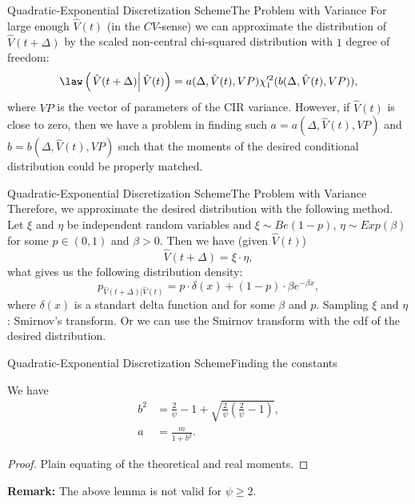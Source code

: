     \begin{frame}{Quadratic-Exponential Discretization Scheme}{The Problem with Variance}
        For large enough $\hat{V}(t)$ (in the $CV$-sense) we can approximate the distribution of $\hat{V}(t+\Delta)$ by the scaled non-central chi-squared distribution with $1$ degree of freedom:
        \begin{align}
            \law\left(\left.\hat{V}(t+\Delta) \right| \hat V(t)\right) =  a(\Delta, \hat{V}(t), VP) \chi'^2_1(b(\Delta, \hat{V}(t), VP)),
        \end{align}
        where $VP$ is the vector of parameters of the CIR variance.
        However, if $\hat{V}(t)$ is close to zero, then we have a problem in finding such $a = a(\Delta, \hat{V}(t), VP)$ and $b = b(\Delta, \hat{V}(t), VP)$ such that the moments of the desired conditional distribution could be properly matched.
    \end{frame}

    \begin{frame}{Quadratic-Exponential Discretization Scheme}{The Problem with Variance}
        Therefore, we approximate the desired distribution with the following method. Let $\xi$ and $\eta$ be independent random variables and  $\xi \sim Be(1-p)$, $\eta \sim Exp(\beta)$ for some $p \in (0, 1)$ and $\beta > 0$. Then we have (given $\hat{V}(t)$)
        \begin{equation}
            \hat{V}(t+\Delta) = \xi\cdot\eta,
        \end{equation}
        what gives us the following distribution density:
        \begin{equation}
            p_{\hat{V}(t+\Delta)\vert \hat{V}(t)} = p\cdot \delta(x) + (1-p) \cdot\beta e^{-\beta x},
        \end{equation}
        where $\delta(x)$ is a standart delta function and for some $\beta$ and $p$.
        Sampling $\xi$ and $\eta$: Smirnov's transform. Or we can use the Smirnov transform with the cdf of the desired distribution.
    \end{frame}

    \begin{frame}{Quadratic-Exponential Discretization Scheme}{Finding the constants}
        \begin{lemma}
            We have
            \begin{align}
                b^2 &= \frac{2}{\psi} -1 +\sqrt{\frac{2}{\psi}\left(\frac{2}{\psi}-1\right)}, \\ 
                a   &= \frac{m}{1+b^2}.
            \end{align}
        \end{lemma}
        \begin{proof}
            Plain equating of the theoretical and real moments.
        \end{proof}
        \textbf{Remark:} The above lemma is not valid for $\psi \geq 2$.
    \end{frame}

